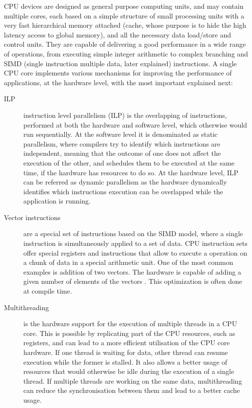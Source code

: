 CPU devices are designed as general purpose computing units, and may contain multiple cores, each based on a simple structure of small processing units with a very fast hierarchical memory attached (cache, whose purpose is to hide the high latency access to global memory), and all the necessary data load/store and control units. They are capable of delivering a good performance in a wide range of operations, from executing simple integer arithmetic to complex branching and SIMD (single instruction multiple data, later explained) instructions. A single CPU core implements various mechanisms for improving the performance of applications, at the hardware level, with the most important explained next:

\begin{center}
	\begin{description}
		\item[ILP] instruction level parallelism (ILP) is the overlapping of instructions, performed at both the hardware and software level, which otherwise would run sequentially. At the software level it is denominated as static parallelism, where compilers try to identify which instructions are independent, meaning that the outcome of one does not affect the execution of the other, and schedules them to be executed at the same time, if the hardware has resources to do so. At the hardware level, ILP can be referred as dynamic parallelism as the hardware dynamically identifies which instructions execution can be overlapped while the application is running.

		\item[Vector instructions] are a special set of instructions based on the SIMD model, where a single instruction is simultaneously applied to a set of data. CPU instruction sets offer special registers and instructions that allow to execute a operation on a chunk of data in a special arithmetic unit. One of the most common examples is addition of two vectors. The hardware is capable of adding a given number of elements of the vectors . This optimization is often done at compile time.

		\item[Multithreading] is the hardware support for the execution of multiple threads in a CPU core. This is possible by replicating part of the CPU resources, such as registers, and can lead to a more efficient utilisation of the CPU core hardware. If one thread is waiting for data, other thread can resume execution while the former is stalled. It also allows a better usage of resources that would otherwise be idle during the execution of a single thread. If multiple threads are working on the same data, multithreading can reduce the synchronisation between them and lead to a better cache usage.
	\end{description}
\end{center}

